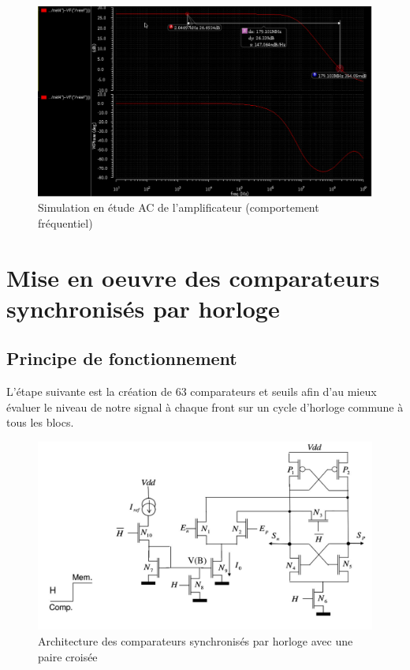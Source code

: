\documentclass[11pt]{article}
\begin{document}
\begin{figure}[!htb]
\begin{center}
  \includegraphics[width=\linewidth]{sim_EB_freq.png}
  \caption{Simulation en \'etude AC  de l'amplificateur (comportement fr\'equentiel)}
\end{center}
\end{figure}


\clearpage

\section{Mise en oeuvre des comparateurs synchronis\'es par horloge}
\subsection{Principe de fonctionnement}
L'\'etape suivante est la cr\'eation de 63 comparateurs et seuils afin d'au mieux \'evaluer le niveau de
notre signal \`a chaque front sur un cycle d'horloge commune \`a tous les blocs.

\begin{figure}[!htb]
\begin{center}
  \includegraphics[scale=0.38]{comparateur_schema.jpg}
  \caption{Architecture des comparateurs synchronis\'es par horloge avec une paire crois\'ee}
\end{center}
\end{figure}
\end{document}
